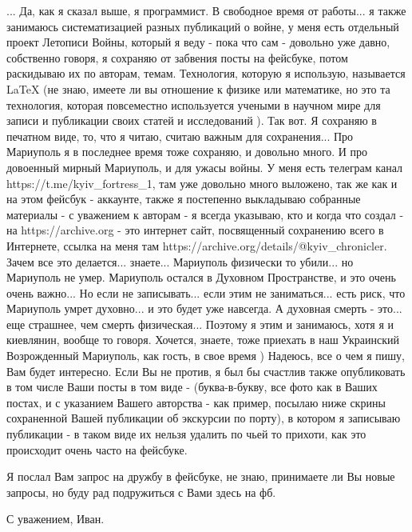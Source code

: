 ... Да, как я сказал выше, я программист. В свободное время от работы... я
также занимаюсь систематизацией разных публикаций о войне, у меня есть
отдельный проект Летописи Войны, который я веду - пока что сам - довольно уже
давно, собственно говоря, я сохраняю от забвения посты на фейсбуке, потом
раскидываю их по авторам, темам. Технология, которую я использую, называется
LaTeX (не знаю, имеете ли вы отношение к физике или математике, но это та
технология, которая повсеместно используется учеными в научном мире для записи
и публикации своих статей и исследований ). Так вот.  Я сохраняю в печатном
виде, то, что я читаю, считаю важным для сохранения...  Про Мариуполь я в
последнее время тоже сохраняю, и довольно много. И про довоенный мирный
Мариуполь, и для ужасы войны. У меня есть телеграм канал
https://t.me/kyiv_fortress_1, там уже довольно много выложено, так же как и на
этом фейсбук - аккаунте, также я постепенно выкладываю собранные  материалы - с
уважением к авторам - я всегда указываю, кто и когда что создал - на
https://archive.org - это интернет сайт, посвященный сохранению всего в
Интернете, ссылка на меня там https://archive.org/details/@kyiv_chronicler.
Зачем все это делается... знаете... Мариуполь физически то убили... но
Мариуполь не умер. Мариуполь остался в Духовном Пространстве, и это очень очень
важно... Но если не записывать... если этим не заниматься... есть риск, что
Мариуполь умрет духовно... и это будет уже навсегда. А духовная смерть - это...
еще страшнее, чем смерть физическая... Поэтому я этим и занимаюсь, хотя я и
киевлянин, вообще то говоря. Хочется, знаете, тоже приехать в наш Украинский
Возрожденный Мариуполь, как гость, в свое время ) Надеюсь, все о чем я пишу,
Вам будет интересно. Если Вы не против, я был бы счастлив также опубликовать в
том числе Ваши посты в том виде - (буква-в-букву, все фото как в Ваших постах,
и с указанием Вашего авторства - как пример, посылаю ниже скрины сохраненной
Вашей публикации об экскурсии по порту), в котором я записываю публикации - в
таком виде их нельзя удалить по чьей то прихоти, как это происходит очень часто
на фейсбуке.

Я послал Вам запрос на дружбу в фейсбуке, не знаю, принимаете ли Вы новые запросы, 
но буду рад подружиться с Вами здесь на фб.

С уважением, Иван.


